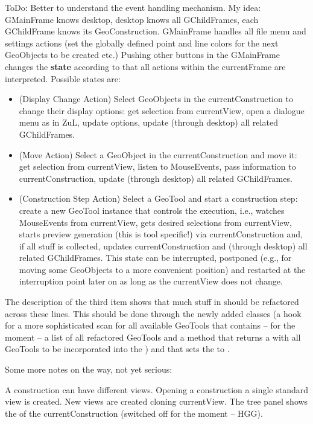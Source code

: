 ToDo: Better to understand the event handling mechanism. My idea: GMainFrame
knows desktop, desktop knows all GChildFrames, each GChildFrame knows its
GeoConstruction. GMainFrame handles all file menu and settings actions (set
the globally defined point and line colors for the next GeoObjects to be
created etc.)  Pushing other buttons in the GMainFrame changes the {\bf state}
according to that all actions within the currentFrame are interpreted.
Possible states are:
\begin{itemize}
\item (Display Change Action) Select GeoObjects in the currentConstruction to
  change their display options: get selection from currentView, open a
  dialogue menu as in ZuL, update options, update (through desktop) all
  related GChildFrames.
\item (Move Action) Select a GeoObject in the currentConstruction and move it:
  get selection from currentView, listen to MouseEvents, pass information to
  currentConstruction, update (through desktop) all related GChildFrames.
\item (Construction Step Action) Select a GeoTool and start a construction
  step: create a new GeoTool instance that controls the execution, i.e.,
  watches MouseEvents from currentView, gets desired selections from
  currentView, starts preview generation (this is tool specific!) via
  currentConstruction and, if all stuff is collected, updates
  currentConstruction and (through desktop) all related GChildFrames. This
  state can be interrupted, postponed (e.g., for moving some GeoObjects to a
  more convenient position) and restarted at the interruption point later on
  as long as the currentView does not change.
\end{itemize}
The description of the third item shows that much stuff in
 should be refactored across these lines.  This should
be done through the newly added classes  (a hook for a more
sophisticated scan for all available GeoTools that contains -- for the moment
-- a list of all refactored GeoTools and a 
method that returns a  with all GeoTools to be incorporated into
the ) and  that sets the
 to .

Some more notes on the way, not yet serious:

A construction can have different views. Opening a construction a single
standard view is created. New views are created cloning currentView.  The tree
panel shows the  of the currentConstruction (switched off for
the moment -- HGG).

